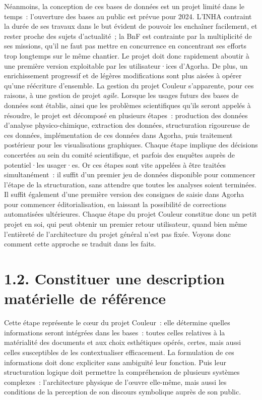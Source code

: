 \documentclass[a4paper,12pt, twoside]{book}
\begin{document}
Néanmoins, la conception de ces bases de données est un projet limité dans le temps~: l’ouverture des bases au public est prévue pour 2024. L’INHA contraint la durée de ses travaux dans le but évident de pouvoir les enchaîner facilement, et rester proche des sujets d’actualité~; la BnF est contrainte par la multiplicité de ses missions, qu'il ne faut pas mettre en concurrence en concentrant ses efforts trop longtemps sur le même chantier. Le projet doit donc rapidement aboutir à une première version exploitable par les utilisateur·ices d’Agorha. De plus, un enrichissement progressif et de légères modifications sont plus aisées à opérer qu’une réécriture d’ensemble. La gestion du projet Couleur s’apparente, pour ces raisons, à une gestion de projet \textit{agile}. Lorsque les usages futurs des bases de données sont établis, ainsi que les problèmes scientifiques qu’ils seront appelés à résoudre, le projet est décomposé en plusieurs étapes~: production des données d’analyse physico-chimique, extraction des données, structuration rigoureuse de ces données, implémentation de ces données dans Agorha, puis traitement postérieur pour les visualisations graphiques. Chaque étape implique des décisions concertées au sein du comité scientifique, et parfois des enquêtes auprès de potentiel·les usager·es. Or ces étapes sont vite appelées à être traitées simultanément~: il suffit d’un premier jeu de données disponible pour commencer l’étape de la structuration, sans attendre que toutes les analyses soient terminées. Il suffit également d’une première version des consignes de saisie dans Agorha pour commencer éditorialisation, en laissant la possibilité de corrections automatisées ultérieures. Chaque étape du projet Couleur constitue donc un petit projet en soi, qui peut obtenir un premier retour utilisateur, quand bien même l’entièreté de l’architecture du projet général n’est pas fixée. Voyons donc comment cette approche se traduit dans les faits.

\section*{1.2. Constituer une description matérielle de référence}

Cette étape représente le cœur du projet Couleur~: elle détermine quelles informations seront intégrées dans les bases~: toutes celles relatives à la matérialité des documents et aux choix esthétiques opérés, certes, mais aussi celles susceptibles de les contextualiser efficacement. La formulation de ces informations doit donc expliciter sans ambiguïté leur fonction. Puis leur structuration logique doit permettre la compréhension de plusieurs systèmes complexes~: l’architecture physique de l’œuvre elle-même, mais aussi les conditions de la perception de son discours symbolique auprès de son public.
\end{document}
